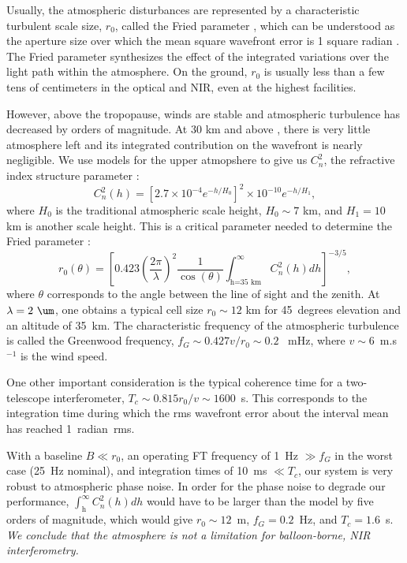 Usually, the atmospheric disturbances are represented by a characteristic turbulent scale size, $r_0$, called the Fried parameter \citep{Fried:1966tk}, which can be understood as the aperture size over which the mean square wavefront error is 1 square radian \citep{Hardy:1998ul}. The Fried parameter synthesizes the effect of the integrated variations over the light path within the atmosphere. On the ground, $r_0$ is usually less than a few tens of centimeters in the optical and NIR, even at the highest facilities.

However, above the tropopause, winds are stable and atmospheric turbulence has decreased by orders of magnitude. At 30 km and above \citep{Perlot:2009jqa}, there is very little atmosphere left and its integrated contribution on the wavefront is nearly negligible. We use models for the upper atmopshere \citep{Perlot:2009jqa} to give us $C_n^2$, the refractive index structure parameter \citep{Hardy:1998ul}:
\begin{equation}
C_n^2(h) = \left[2.7\times 10^{-4}e^{-h/H_0}\right]^2\times 10^{-10}e^{-h/H_1},
\end{equation}
where $H_0$ is the traditional atmospheric scale height, $H_0\sim 7$ km, and $H_1=10$ km is another scale height\cite{Perlot:2009p1124}. This is a critical parameter needed to determine the Fried parameter \citep{Hardy:1998ul}:
\begin{equation}
r_0(\theta) = \left[0.423\left(\frac{2\pi}{\lambda}\right)^2\frac{1}{\cos(\theta)} \int_{\textrm{h=35~km}}^{\infty} C_n^2(h)dh\right]^{-3/5},
\end{equation}
where $\theta$ corresponds to the angle between the line of sight and the zenith. At $\lambda=2~\um$, one obtains a typical cell size $r_0\sim 12$ km for 45~degrees elevation and an altitude of 35~km. The characteristic frequency of the atmospheric turbulence is called the Greenwood frequency\cite{Hardy:1998p2181}, $f_G\sim0.427 v /r_0\sim 0.2$ ~mHz, where $v\sim 6$~m.s$^{-1}$ is the wind speed.

One other important consideration is the typical coherence time for a two-telescope interferometer\cite{Colavita:1999p153}, $T_c\sim 0.815r_0/v\sim 1600$~s. This corresponds to the integration time during which the rms wavefront error about the interval mean has reached 1~radian~rms.

With a baseline $B\ll r_0$, an operating FT frequency of 1~Hz $\gg f_G$ in the worst case (25~Hz nominal), and integration times of 10~ms $\ll T_c$, our system is very robust to atmospheric phase noise. In order for the phase noise to degrade our performance, $\int_{\textrm{h}}^{\infty} C_n^2(h)dh$ would have to be larger than the model by five orders of magnitude, which would give $r_0\sim 12$~m, $f_G=0.2$~Hz, and $T_c=1.6$~s. \textit{We conclude that the atmosphere is not a limitation for balloon-borne, NIR interferometry.}


